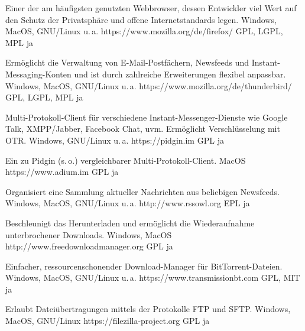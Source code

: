 




{Einer der am häufigsten genutzten Webbrowser, dessen Entwickler viel Wert auf den Schutz der Privatsphäre und offene Internetstandards legen.}
{Windows, MacOS, GNU/Linux u.\,a.}
{https://www.mozilla.org/de/firefox/}
{GPL, LGPL, MPL}
{ja}

{Ermöglicht die Verwaltung von E-Mail-Postfächern, Newsfeeds und Instant-Messaging-Konten und ist durch zahlreiche Erweiterungen flexibel anpassbar.}
{Windows, MacOS, GNU/Linux u.\,a.}
{https://www.mozilla.org/de/thunderbird/}
{GPL, LGPL, MPL}
{ja}

{Multi-Protokoll-Client für verschiedene Instant-Messenger-Dienste wie \mbox{Google} Talk, XMPP/Jabber, Facebook Chat, uvm. Ermöglicht Verschlüsselung mit OTR.}
{Windows, GNU/Linux u.\,a.}
{https://pidgin.im}
{GPL}
{ja}

{Ein zu Pidgin (s.\,o.) vergleichbarer Multi-Protokoll-Client.}
{MacOS}
{https://www.adium.im}
{GPL}
{ja}

{Organisiert eine Sammlung aktueller Nachrichten aus beliebigen Newsfeeds.}
{Windows, MacOS, GNU/Linux u.\,a.}
{http://www.rssowl.org}
{EPL}
{ja}

{Beschleunigt das Herunterladen und ermöglicht die Wiederaufnahme unterbrochener Downloads.}
{Windows, MacOS}
{http://www.freedownloadmanager.org}
{GPL}
{ja}

{Einfacher, ressourcenschonender Download-Manager für BitTorrent-Dateien.}
{Windows, MacOS, GNU/Linux u.\,a.}
{https://www.transmissionbt.com}
{GPL, MIT}
{ja}

{Erlaubt Dateiübertragungen mittels der Protokolle FTP und SFTP.}
{Windows, MacOS, GNU/Linux}
{https://filezilla-project.org}
{GPL}
{ja}

\backpage



